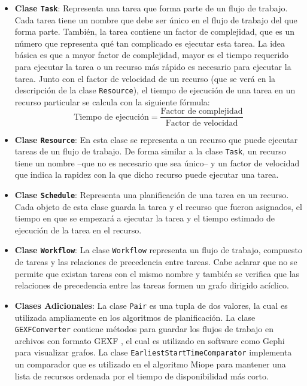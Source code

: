 \begin{itemize}

\item{\textbf{Clase \texttt{Task}}: Representa una tarea que forma parte de un flujo de trabajo. Cada tarea tiene un nombre que debe ser único en el flujo de trabajo del que forma parte. También, la tarea contiene un factor de complejidad, que es un número que representa qué tan complicado es ejecutar esta tarea. La idea básica es que a mayor factor de complejidad, mayor es el tiempo requerido para ejecutar la tarea o un recurso más rápido es necesario para ejecutar la tarea. Junto con el factor de velocidad de un recurso (que se verá en la descripción de la clase \texttt{Resource}), el tiempo de ejecución de una tarea en un recurso particular se calcula con la siguiente fórmula:
\begin{equation}
  \text{Tiempo de ejecución} = \frac{\text{Factor de complejidad}}{\text{Factor de velocidad}}
\end{equation}}

\item \textbf{Clase \texttt{Resource}}: En esta clase se representa a un recurso que puede ejecutar tareas de un flujo de trabajo. De forma similar a la clase \texttt{Task}, un recurso tiene un nombre --que no es necesario que sea único-- y un factor de velocidad que indica la rapidez con la que dicho recurso puede ejecutar una tarea.

\item \textbf{Clase \texttt{Schedule}}: Representa una planificación de una tarea en un recurso. Cada objeto de esta clase guarda la tarea y el recurso que fueron asignados, el tiempo en que se empezará a ejecutar la tarea y el tiempo estimado de ejecución de la tarea en el recurso.

\item \textbf{Clase \texttt{Workflow}}: La clase \texttt{Workflow} representa un flujo de trabajo, compuesto de tareas y las relaciones de precedencia entre tareas. Cabe aclarar que no se permite que existan tareas con el mismo nombre y también se verifica que las relaciones de precedencia entre las tareas formen un grafo dirigido acíclico.

\item \textbf{Clases Adicionales}: La clase \texttt{Pair} es una tupla de dos valores, la cual es utilizada ampliamente en los algoritmos de planificación. La clase \texttt{GEXFConverter} contiene métodos para guardar los flujos de trabajo en archivos con formato GEXF \cite{gexf2014}, el cual es utilizado en software como Gephi \cite{bastian2009gephi} para visualizar grafos. La clase \texttt{EarliestStartTimeComparator} implementa un comparador que es utilizado en el algoritmo Miope para mantener una lista de recursos ordenada por el tiempo de disponibilidad más corto.
\end{itemize}

